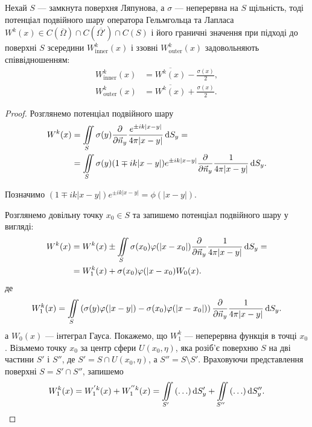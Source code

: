 \begin{theorem}
	Нехай $S$ --- замкнута поверхня Ляпунова, а $\sigma$ --- неперервна на $S$ щільність, тоді потенціал подвійного шару оператора Гельмгольца та Лапласа $W^k(x) \in C (\overline{\Omega}) \cap C (\overline{\Omega'}) \cap C (S)$ і його граничні значення при підході до поверхні $S$ зсередини $W_{\text{inner}}^k(x)$ і ззовні $W_{\text{outer}}^k(x)$ задовольняють співвідношенням:
	\begin{align}
		W_{\text{inner}}^k(x) &= \overline{W^k(x)} - \frac{\sigma(x)}{2}, \\
		W_{\text{outer}}^k(x) &= \overline{W^k(x)} + \frac{\sigma(x)}{2}.
	\end{align}
\end{theorem}

\begin{proof}
	Розглянемо потенціал подвійного шару
	\begin{equation}
		\begin{aligned}
			W^k(x) &= \displaystyle\iint\limits_S \sigma(y) \frac{\partial}{\partial \vec n_y} \frac{e^{\pm i k |x - y|}}{4 \pi |x - y|} \mathop{}\!\mathrm{d} S_y = \\
			&= \displaystyle\iint\limits_S \sigma(y) (1 \mp i k |x - y|) e^{\pm i k |x - y|} \frac{\partial}{\partial \vec n_y} \frac{1}{4 \pi |x - y|} \mathop{}\!\mathrm{d} S_y.
		\end{aligned}
	\end{equation}

	Позначимо $(1 \mp i k |x - y|) e^{\pm i k |x - y|} = \phi(|x - y|)$. \medskip

	Розглянемо довільну точку $x_0 \in S$ та запишемо потенціал подвійного шару у вигляді:
	\begin{equation}
		\begin{aligned}
			W^k(x) &= W^k(x) \pm \displaystyle\iint\limits_S \sigma(x_0) \varphi(|x - x_0|) \frac{\partial}{\partial \vec n_y} \frac{1}{4 \pi |x - y|} \mathop{}\!\mathrm{d} S_y = \\
			&= W_1^k(x) + \sigma(x_0) \varphi(|x - x_0) W_0(x).
		\end{aligned}
	\end{equation}
	де
	\begin{equation}
		W_1^k(x) = \displaystyle\iint\limits_S \left( \sigma(y) \varphi(|x - y|) - \sigma(x_0) \varphi(|x - x_0|) \right) \frac{\partial}{\partial \vec n_y} \frac{1}{4 \pi |x - y|} \mathop{}\!\mathrm{d} S_y.
	\end{equation}
	а $W_0(x)$ --- інтеграл Гауса. Покажемо, що $W_1^k$ --- неперервна функція в точці $x_0$. Візьмемо точку $x_0$ за центр сфери $U(x_0, \eta)$, яка розіб'є поверхню $S$ на дві частини $S'$ і $S''$, де $S' = S \cap U(x_0, \eta)$, а $S'' = S \setminus S'$. Враховуючи представлення поверхні $S = S' \cap S''$, запишемо  
	\begin{equation}
		W_1^k(x) = W_1^{'k}(x) + W_1^{''k}(x) = \displaystyle\iint\limits_{S'} \left( \ldots \right) \mathop{}\!\mathrm{d} S_y' + \displaystyle\iint\limits_{S''} \left( \ldots \right) \mathop{}\!\mathrm{d} S_y''.
	\end{equation}
 

\end{proof}
